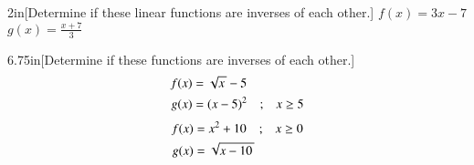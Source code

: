 \begin{myWideProblem}[\large]{2in}[Determine if these linear functions are inverses of each other.]
    {$f(x) = 3x-7$ \qquad $g(x) = \displaystyle\frac{x+7}{3}$ }
\end{myWideProblem}




\begin{my2Problems}[\large]{6.75in}[Determine if these  functions are inverses of each other.]
    {
        \setlength{\abovedisplayskip}{0pt}
        \setlength{\belowdisplayskip}{0pt}
        \begin{align*}
            f(x) &= \myRoot{x} - 5 \\
            g(x) &= (x-5)^2 \quad\text{;}\quad x \geq 5 
        \end{align*}
    }
    {
        \setlength{\abovedisplayskip}{0pt}
        \setlength{\belowdisplayskip}{0pt}
        \begin{align*}
            f(x) &= x^2+10 \quad\text{;}\quad x \geq 0 \\
            g(x) &= \myRoot{x-10}
        \end{align*}
    }
\end{my2Problems}

